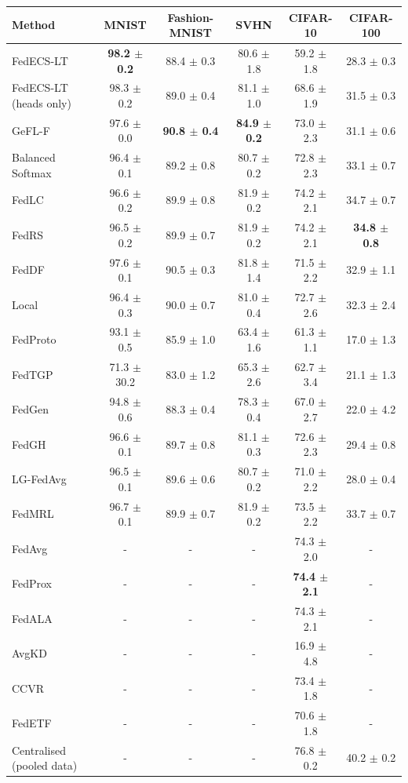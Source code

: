\begin{tabular}{lccccc}
\toprule
Method & MNIST & Fashion-MNIST & SVHN & CIFAR-10 & CIFAR-100\\
\midrule
FedECS-LT & \textbf{98.2 $\pm$ 0.2} & 88.4 $\pm$ 0.3 & 80.6 $\pm$ 1.8 & 59.2 $\pm$ 1.8 & 28.3 $\pm$ 0.3\\
FedECS-LT (heads only) & 98.3 $\pm$ 0.2 & 89.0 $\pm$ 0.4 & 81.1 $\pm$ 1.0 & 68.6 $\pm$ 1.9 & 31.5 $\pm$ 0.3\\
GeFL-F & 97.6 $\pm$ 0.0 & \textbf{90.8 $\pm$ 0.4} & \textbf{84.9 $\pm$ 0.2} & 73.0 $\pm$ 2.3 & 31.1 $\pm$ 0.6\\
Balanced Softmax & 96.4 $\pm$ 0.1 & 89.2 $\pm$ 0.8 & 80.7 $\pm$ 0.2 & 72.8 $\pm$ 2.3 & 33.1 $\pm$ 0.7\\
FedLC & 96.6 $\pm$ 0.2 & 89.9 $\pm$ 0.8 & 81.9 $\pm$ 0.2 & 74.2 $\pm$ 2.1 & 34.7 $\pm$ 0.7\\
FedRS & 96.5 $\pm$ 0.2 & 89.9 $\pm$ 0.7 & 81.9 $\pm$ 0.2 & 74.2 $\pm$ 2.1 & \textbf{34.8 $\pm$ 0.8}\\
FedDF & 97.6 $\pm$ 0.1 & 90.5 $\pm$ 0.3 & 81.8 $\pm$ 1.4 & 71.5 $\pm$ 2.2 & 32.9 $\pm$ 1.1\\
Local & 96.4 $\pm$ 0.3 & 90.0 $\pm$ 0.7 & 81.0 $\pm$ 0.4 & 72.7 $\pm$ 2.6 & 32.3 $\pm$ 2.4\\
FedProto & 93.1 $\pm$ 0.5 & 85.9 $\pm$ 1.0 & 63.4 $\pm$ 1.6 & 61.3 $\pm$ 1.1 & 17.0 $\pm$ 1.3\\
FedTGP & 71.3 $\pm$ 30.2 & 83.0 $\pm$ 1.2 & 65.3 $\pm$ 2.6 & 62.7 $\pm$ 3.4 & 21.1 $\pm$ 1.3\\
FedGen & 94.8 $\pm$ 0.6 & 88.3 $\pm$ 0.4 & 78.3 $\pm$ 0.4 & 67.0 $\pm$ 2.7 & 22.0 $\pm$ 4.2\\
FedGH & 96.6 $\pm$ 0.1 & 89.7 $\pm$ 0.8 & 81.1 $\pm$ 0.3 & 72.6 $\pm$ 2.3 & 29.4 $\pm$ 0.8\\
LG-FedAvg & 96.5 $\pm$ 0.1 & 89.6 $\pm$ 0.6 & 80.7 $\pm$ 0.2 & 71.0 $\pm$ 2.2 & 28.0 $\pm$ 0.4\\
FedMRL & 96.7 $\pm$ 0.1 & 89.9 $\pm$ 0.7 & 81.9 $\pm$ 0.2 & 73.5 $\pm$ 2.2 & 33.7 $\pm$ 0.7\\
FedAvg & - & - & - & 74.3 $\pm$ 2.0 & -\\
FedProx & - & - & - & \textbf{74.4 $\pm$ 2.1} & -\\
FedALA & - & - & - & 74.3 $\pm$ 2.1 & -\\
AvgKD & - & - & - & 16.9 $\pm$ 4.8 & -\\
CCVR & - & - & - & 73.4 $\pm$ 1.8 & -\\
FedETF & - & - & - & 70.6 $\pm$ 1.8 & -\\
Centralised (pooled data) & - & - & - & 76.8 $\pm$ 0.2 & 40.2 $\pm$ 0.2\\
\bottomrule
\end{tabular}
